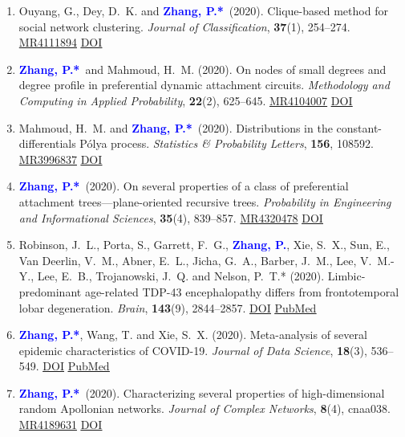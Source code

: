 \documentclass[12pt]{article}
\def\MR#1{\href{http://www.ams.org/mathscinet-getitem?mr=#1}{MR#1}}
\newcommand{\PZ}{\textcolor{blue}{\textbf{Zhang, P.*}}}
\newcommand{\PZnot}{\textcolor{blue}{\textbf{Zhang, P.}}}
\begin{document}
\begin{enumerate}
		\item {\sc Ouyang, G., Dey, D.\ K.} and \PZ\ (2020). 
		Clique-based method for social network clustering. {\em Journal of Classification}, \textbf{37}(1), 254--274. \MR{4111894} \href{https://doi.org/10.1007/s00357-019-9310-5}
		{\underline{DOI}}
		
		\item \PZ\ and {\sc Mahmoud, H.\ M.} (2020). On 
		nodes of small degrees and degree profile in preferential 
		dynamic attachment circuits. {\em Methodology and Computing in Applied Probability}, \textbf{22}(2), 625--645. \MR{4104007}
		\href{https://doi.org/10.1007/s11009-019-09726-4}
		{\underline{DOI}}
		
		\item {\sc Mahmoud, H.\ M.} and \PZ\ (2020). 
		Distributions in the constant-differentials P\'{o}lya process. {\em Statistics \& Probability Letters}, \textbf{156}, 108592. \MR{3996837}
		\href{https://doi.org/10.1016/j.spl.2019.108592}
		{\underline{DOI}}
		
		\item \PZ\ (2020). On several properties of a 
		class of preferential attachment trees---plane-oriented 
		recursive trees. {\em Probability in Engineering and 
		Informational Sciences}, {\bf 35}(4), 839--857. \MR{4320478}
		\href{https://doi.org/10.1017/S0269964820000261}
		{\underline{DOI}}
		
		\item {\sc Robinson, J.\ L., Porta, S., Garrett, F.\ G.}, 
		\PZnot, {\sc Xie, S.\ X., Sun, E., Van Deerlin, V.\ M., Abner, E.\ L., Jicha, G.\ A., Barber, J.\ M., Lee, V.\ M.-Y., Lee, E.\ B., Trojanowski, J.\ Q.} and {\sc Nelson, P.\ T.*} (2020). Limbic-predominant age-related TDP-43 encephalopathy differs from frontotemporal lobar degeneration. {\em Brain}, {\bf 143}(9), 
		2844--2857. \href{https://doi.org/10.1093/brain/awaa219}
		{\underline{DOI}} \href{https://pubmed.ncbi.nlm.nih.gov/32830216}
		{\underline{PubMed}}
		
		\item \PZ, {\sc Wang, T.} and {\sc Xie, S.\ X.} 
		(2020). Meta-analysis of several epidemic characteristics of COVID-19. {\em Journal of Data Science}, {\bf 18}(3), 536--549. \href{https://doi.org/10.6339/JDS.202007_18(3).0019}
		{\underline{DOI}} \href{https://pubmed.ncbi.nlm.nih.gov/33088292}
		{\underline{PubMed}}
		
		\item \PZ\ (2020). Characterizing several properties of 
		high-dimensional random Apollonian networks. {\em 
		Journal of Complex Networks}, {\bf 8}(4), cnaa038. \MR{4189631} \href{https://doi.org/10.1093/comnet/cnaa038}
		{\underline{DOI}}
		

\end{enumerate}
\end{document}
